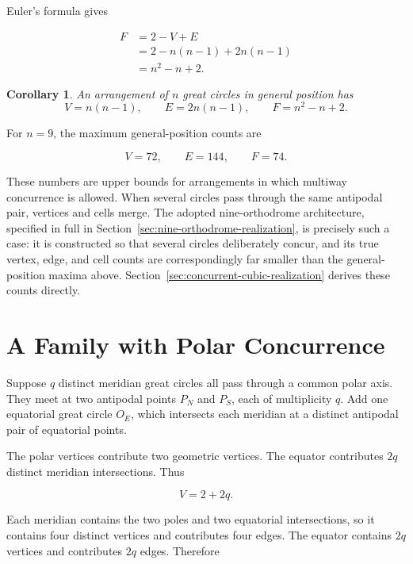 \documentclass[11pt,fleqn]{book}
\numberwithin{equation}{chapter}
\theoremstyle{plain}
\newtheorem{corollary}[theorem]{Corollary}
\theoremstyle{definition}
\theoremstyle{remark}
\begin{document}
Euler's formula gives

\begin{align}
    F
    &=
    2-V+E
    \\
    &=
    2-n(n-1)+2n(n-1)
    \\
    &=
    n^2-n+2.
\end{align}

\begin{corollary}
An arrangement of \(n\) great circles in general position has
\[
V=n(n-1),
\qquad
E=2n(n-1),
\qquad
F=n^2-n+2.
\]
\end{corollary}

For \(n=9\), the maximum general-position counts are

\begin{equation}
    V=72,
    \qquad
    E=144,
    \qquad
    F=74.
\end{equation}

These numbers are upper bounds for arrangements in which multiway concurrence is allowed. When several circles pass through the same antipodal pair, vertices and cells merge. The adopted nine-orthodrome architecture, specified in full in Section~\ref{sec:nine-orthodrome-realization}, is precisely such a case: it is constructed so that several circles deliberately concur, and its true vertex, edge, and cell counts are correspondingly far smaller than the general-position maxima above. Section~\ref{sec:concurrent-cubic-realization} derives these counts directly.

\section{A Family with Polar Concurrence}

Suppose \(q\) distinct meridian great circles all pass through a common polar axis. They meet at two antipodal points \(P_N\) and \(P_S\), each of multiplicity \(q\). Add one equatorial great circle \(O_E\), which intersects each meridian at a distinct antipodal pair of equatorial points.

The polar vertices contribute two geometric vertices. The equator contributes \(2q\) distinct meridian intersections. Thus

\begin{equation}
    V=2+2q.
\end{equation}

Each meridian contains the two poles and two equatorial intersections, so it contains four distinct vertices and contributes four edges. The equator contains \(2q\) vertices and contributes \(2q\) edges. Therefore
\end{document}
